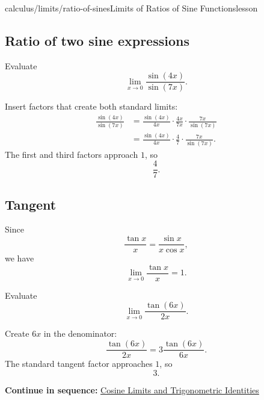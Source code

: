 \documentclass[11pt,openany]{book}
\theoremstyle{bgplain}
\newcounter{bgexample}[chapter]
\newcommand{\webnext}[2]{%
  \par\addvspace{1.2em}\noindent{\color{BGLine}\rule{\textwidth}{0.35pt}}\par\smallskip
  {\small\color{BGGray}\textbf{Continue in sequence:} \hyperlink{web:#1}{#2}}\par
}
\begin{document}
\begin{webpage}{calculus/limits/ratio-of-sines}{Limits of Ratios of Sine Functions}{lesson}
\subsection{Ratio of two sine expressions}

\begin{bgexample}[title={Sine over sine}]
Evaluate
\[
  \lim_{x\to0}\frac{\sin(4x)}{\sin(7x)}.
\]

\begin{bgsolution}
Insert factors that create both standard limits:
\begin{align*}
\frac{\sin(4x)}{\sin(7x)}
&=\frac{\sin(4x)}{4x}
  \cdot\frac{4x}{7x}
  \cdot\frac{7x}{\sin(7x)}\\
&=\frac{\sin(4x)}{4x}
  \cdot\frac47
  \cdot\frac{7x}{\sin(7x)}.
\end{align*}
The first and third factors approach \(1\), so
\[
  \boxed{\frac47}.
\]
\end{bgsolution}
\end{bgexample}

\subsection{Tangent}

Since
\[
  \frac{\tan x}{x}
  =\frac{\sin x}{x\cos x},
\]
we have
\[
  \boxed{\lim_{x\to0}\frac{\tan x}{x}=1}.
\]

\begin{bgexample}[title={A tangent limit}]
Evaluate
\[
  \lim_{x\to0}\frac{\tan(6x)}{2x}.
\]

\begin{bgsolution}
Create \(6x\) in the denominator:
\[
  \frac{\tan(6x)}{2x}
  =3\frac{\tan(6x)}{6x}.
\]
The standard tangent factor approaches \(1\), so
\[
  \boxed{3}.
\]
\end{bgsolution}
\end{bgexample}
\webnext{calculus/limits/cosine-limits}{Cosine Limits and Trigonometric Identities}
\end{webpage}
\end{document}
